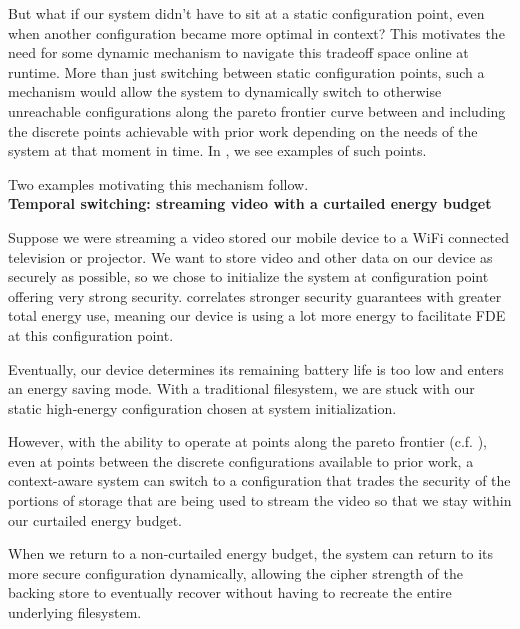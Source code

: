 But what if our system didn't have to sit at a static configuration point, even
when another configuration became more optimal in context? This motivates the
need for some dynamic mechanism to navigate this tradeoff space online at
runtime. More than just switching between static configuration points, such a
mechanism would allow the system to dynamically switch to otherwise unreachable
configurations along the pareto frontier curve between and including the
discrete points achievable with prior work depending on the needs of the system
at that moment in time. In , we see examples of
such points. 

Two examples motivating this mechanism follow.\\

\noindent
\textbf{Temporal switching: streaming video with a curtailed energy budget}

Suppose we were streaming a video stored our mobile device to a WiFi connected
television or projector. We want to store video and other data on our device as
securely as possible, so we chose to initialize the system at configuration
point offering very strong security. 
correlates stronger security guarantees with greater total energy use, meaning
our device is using a lot more energy to facilitate FDE at this configuration
point.

Eventually, our device determines its remaining battery life is too low and
enters an energy saving mode. With a traditional filesystem, we are stuck with
our static high-energy configuration chosen at system initialization.

However, with the ability to operate at points along the pareto frontier (c.f.
), even at points between the discrete
configurations available to prior work, a context-aware system can switch to a
configuration that trades the security of the portions of storage that are being
used to stream the video so that we stay within our curtailed energy budget.

When we return to a non-curtailed energy budget, the system can return to its
more secure configuration dynamically, allowing the cipher strength of the
backing store to eventually recover without having to recreate the entire
underlying filesystem.\\

